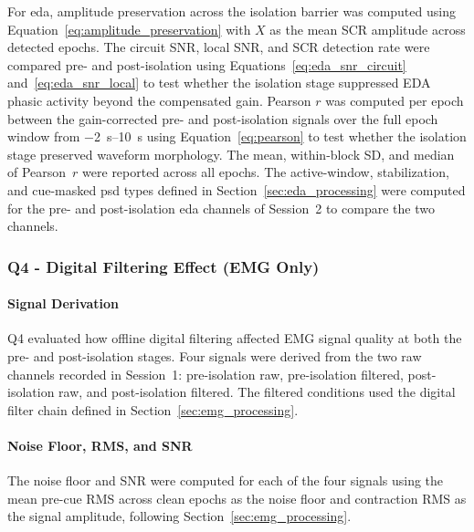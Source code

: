 For \gls{eda}, amplitude preservation across the isolation barrier was computed using Equation~\ref{eq:amplitude_preservation} with $X$ as the mean SCR amplitude across detected epochs. The circuit SNR, local SNR, and SCR detection rate were compared pre- and post-isolation using Equations~\ref{eq:eda_snr_circuit} and~\ref{eq:eda_snr_local} to test whether the isolation stage suppressed EDA phasic activity beyond the compensated gain. Pearson $r$ was computed per epoch between the gain-corrected pre- and post-isolation signals over the full epoch window from \SIrange{-2}{10}{\second} using Equation~\ref{eq:pearson} to test whether the isolation stage preserved waveform morphology. The mean, within-block SD, and median of Pearson~$r$ were reported across all epochs. The active-window, stabilization, and cue-masked \gls{psd} types defined in Section~\ref{sec:eda_processing} were computed for the pre- and post-isolation \gls{eda} channels of Session~2 to compare the two channels.

\subsubsection{Q4 - Digital Filtering Effect (EMG Only)}
\label{sec:q4_digital_filtering}

\paragraph{Signal Derivation} 
Q4 evaluated how offline digital filtering affected EMG signal quality at both the pre- and post-isolation stages. Four signals were derived from the two raw channels recorded in Session~1: pre-isolation raw, pre-isolation filtered, post-isolation raw, and post-isolation filtered. The filtered conditions used the digital filter chain defined in Section~\ref{sec:emg_processing}.

\paragraph{Noise Floor, RMS, and SNR} 
The noise floor and SNR were computed for each of the four signals using the mean pre-cue RMS across clean epochs as the noise floor and contraction RMS as the signal amplitude, following Section~\ref{sec:emg_processing}.

